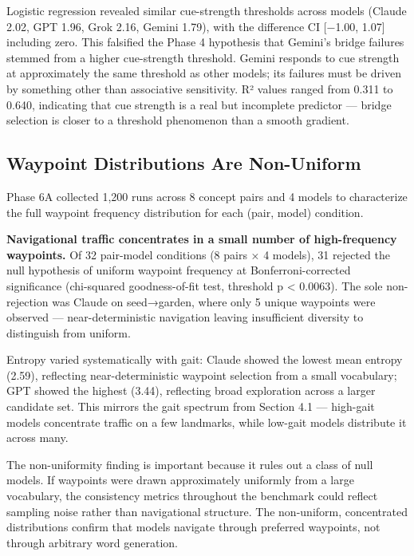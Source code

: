 Logistic regression revealed similar cue-strength thresholds across models (Claude 2.02, GPT 1.96, Grok 2.16, Gemini 1.79), with the difference CI {[}−1.00, 1.07{]} including zero. This falsified the Phase 4 hypothesis that Gemini's bridge failures stemmed from a higher cue-strength threshold. Gemini responds to cue strength at approximately the same threshold as other models; its failures must be driven by something other than associative sensitivity. R² values ranged from 0.311 to 0.640, indicating that cue strength is a real but incomplete predictor --- bridge selection is closer to a threshold phenomenon than a smooth gradient.

\subsection{Waypoint Distributions Are Non-Uniform}\label{waypoint-distributions-are-non-uniform}

Phase 6A collected 1,200 runs across 8 concept pairs and 4 models to characterize the full waypoint frequency distribution for each (pair, model) condition.

\textbf{Navigational traffic concentrates in a small number of high-frequency waypoints.} Of 32 pair-model conditions (8 pairs × 4 models), 31 rejected the null hypothesis of uniform waypoint frequency at Bonferroni-corrected significance (chi-squared goodness-of-fit test, threshold p \textless{} 0.0063). The sole non-rejection was Claude on seed→garden, where only 5 unique waypoints were observed --- near-deterministic navigation leaving insufficient diversity to distinguish from uniform.

Entropy varied systematically with gait: Claude showed the lowest mean entropy (2.59), reflecting near-deterministic waypoint selection from a small vocabulary; GPT showed the highest (3.44), reflecting broad exploration across a larger candidate set. This mirrors the gait spectrum from Section 4.1 --- high-gait models concentrate traffic on a few landmarks, while low-gait models distribute it across many.

The non-uniformity finding is important because it rules out a class of null models. If waypoints were drawn approximately uniformly from a large vocabulary, the consistency metrics throughout the benchmark could reflect sampling noise rather than navigational structure. The non-uniform, concentrated distributions confirm that models navigate through preferred waypoints, not through arbitrary word generation.

